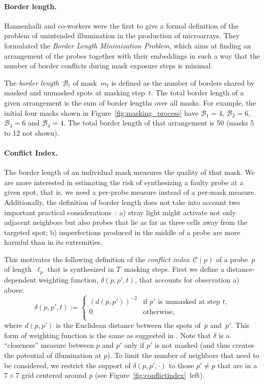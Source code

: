 \documentclass[english]{lni}
\begin{document}
\paragraph{Border length.}
Hannenhalli and co-workers \cite{HANNENHALLI02} were the first to give a formal
definition of the problem
of unintended illumination in the production of microarrays. They formulated the
\emph{Border Length Minimization Problem}, which aims at finding an arrangement
of the probes together with their embeddings in such a way that the number of border
conflicts during mask exposure steps is minimal.

The \emph{border length}~$\mathcal{B}_t$ of mask~$m_{t}$ is defined as
the number of borders shared by masked and unmasked spots at masking
step~$t$. The total border length of a given arrangement is the sum of
border lengths over all masks. For example, the initial four masks
shown in Figure~\ref{fig:masking_process} have $\mathcal{B}_1 = 4$,
$\mathcal{B}_2 = 6$, $\mathcal{B}_3 = 6$ and $\mathcal{B}_4 = 4$. The
total border length of that arrangement is 50 (masks 5 to 12 not
shown).

\paragraph{Conflict Index.}
The border length of an individual mask measures the quality of that
mask. We are more interested in estimating the risk of synthesizing a faulty
probe at a given spot, that is, we need a per-probe measure
instead of a per-mask measure. Additionally,
the definition of border length does not take into account two
important practical considerations~\cite{KAHNG03A}:
a) stray light might activate not only adjacent neighbors but
also probes that lie as far as three cells away from the targeted
spot;
b) imperfections produced in the middle of a probe are more
harmful than in its extremities.

This motivates the following definition of the \emph{conflict
  index}~$\mathcal{C}(p)$ of a probe~$p$ of length~$\ell_{p}$ that is
synthesized in $T$~masking steps. First we define a distance-dependent
weighting function, $\delta(p,p',t)$, that accounts for observation a)
above:
\begin{equation}
\label{eq:dist_weight}
\delta(p,p',t) :=
\left\{
        \begin{array}{ll}
                (d(p,p'))^{-2} & \mbox{if $p'$ is unmasked at step $t$}, \\
                0 & \mbox{otherwise}, \\
        \end{array}
\right.
\end{equation}
where $d(p,p')$ is the Euclidean distance between the spots of~$p$ and~$p'$.
This form of weighting function is the same as suggested in
\cite{KAHNG03A}.  Note that $\delta$ is a ``closeness'' measure
between $p$ and $p'$ only if $p'$ is
not masked (and thus creates the potential of illumination at $p$). To
limit the number of neighbors that need to be considered, we
restrict the support of $\delta(p,p',\cdot)$ to those $p'\neq p$ that
are in a $7\times 7$ grid centered around $p$ (see
Figure~\ref{fig:conflictindex}~left).
\end{document}
